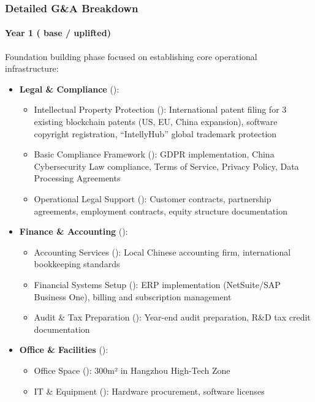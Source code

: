 \documentclass[11pt, a4paper, oneside]{article}
\begin{document}
\subsubsection{Detailed G\&A Breakdown}

\paragraph{Year 1 ( base /  uplifted)}
Foundation building phase focused on establishing core operational infrastructure:

\begin{itemize}
    \item \textbf{Legal \& Compliance} ():
    \begin{itemize}
        \item Intellectual Property Protection (): International patent filing for 3 existing blockchain patents (US, EU, China expansion), software copyright registration, ``IntellyHub'' global trademark protection
        \item Basic Compliance Framework (): GDPR implementation, China Cybersecurity Law compliance, Terms of Service, Privacy Policy, Data Processing Agreements
        \item Operational Legal Support (): Customer contracts, partnership agreements, employment contracts, equity structure documentation
    \end{itemize}
    
    \item \textbf{Finance \& Accounting} ():
    \begin{itemize}
        \item Accounting Services (): Local Chinese accounting firm, international bookkeeping standards
        \item Financial Systems Setup (): ERP implementation (NetSuite/SAP Business One), billing and subscription management
        \item Audit \& Tax Preparation (): Year-end audit preparation, R\&D tax credit documentation
    \end{itemize}
    
    \item \textbf{Office \& Facilities} ():
    \begin{itemize}
        \item Office Space (): 300m² in Hangzhou High-Tech Zone
        \item IT \& Equipment (): Hardware procurement, software licenses
    \end{itemize}
    

\end{itemize}
\end{document}
